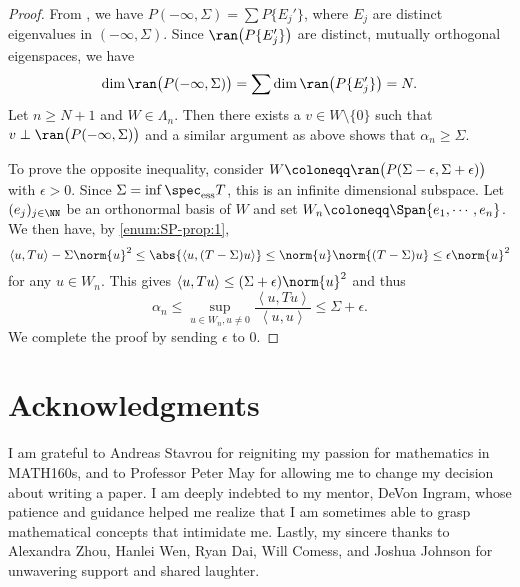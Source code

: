 \documentclass[oneside,reqno,letterpaper]{amsart}
\newcommand{\essspec}{\spec_{\text{ess}}}
\begin{document}
\begin{proof}
  From , we have \(P(-\infty, \Sigma) = \sum P \{E_j'\}\), where \(E_j\) are distinct eigenvalues in \((-\infty, \Sigma)\). 
  Since \(\ran\big(P \{E_j'\} \big)\) are distinct, mutually orthogonal eigenspaces, we have 
  \[
    \dim \ran\big(P(-\infty, \Sigma)\big)
    = \sum \dim \ran\big(P\{E_j'\}\big)
    = N .
  \] 
  Let \(n \geq N + 1\) and \(W \in \Lambda_{n}\). 
  Then there exists a \(v \in W \setminus \{0\}\) such that \(v \perp \ran\big(P(-\infty, \Sigma)\big)\) and a similar argument as above shows that \(\alpha_n \geq \Sigma\). 

  To prove the opposite inequality, consider \(W \coloneqq \ran\big(P(\Sigma - \epsilon, \Sigma + \epsilon)\big)\) with \(\epsilon > 0\). 
  Since \(\Sigma = \inf \essspec T\), this is an infinite dimensional subspace. 
  Let \((e_j)_{j \in \NN}\) be an orthonormal basis of \(W\) and set \(W_n \coloneqq \Span \{e_1, \cdots, e_n\}\).
  We then have, by  \ref{enum:SP-prop:1}, 
  \[
    \left< u, Tu \right> - \Sigma \norm{u}^2  
    \leq \abs{\left< u, (T - \Sigma)u \right>} 
    \leq \norm{u} \norm{(T - \Sigma)u} 
    \leq \epsilon \norm{u}^2 
  \] 
  for any \(u \in W_n\). 
  This gives \(\left< u, Tu \right> \leq (\Sigma + \epsilon) \norm{u}^2 \) and thus
  \[
    \alpha_n \leq \sup_{u \in W_n, u \neq 0} \frac{\left< u, Tu \right>}{\left< u, u \right>} \leq \Sigma + \epsilon . 
  \] 
  We complete the proof by sending \(\epsilon\) to \(0\). 
\end{proof}







\section*{Acknowledgments}
I am grateful to Andreas Stavrou for reigniting my passion for mathematics in MATH160s, and to Professor Peter May for allowing me to change my decision about writing a paper.
I am deeply indebted to my mentor, DeVon Ingram, whose patience and guidance helped me realize that I am sometimes able to grasp mathematical concepts that intimidate me. 
Lastly, my sincere thanks to Alexandra Zhou, Hanlei Wen, Ryan Dai, Will Comess, and Joshua Johnson for unwavering support and shared laughter. 





\printbibliography
\nocite{*}
\end{document}
